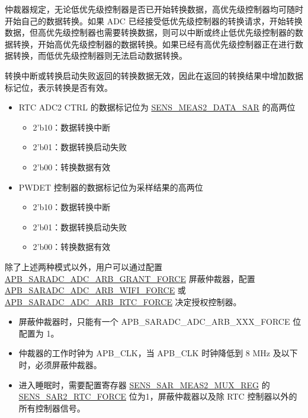 \documentclass[main\_\_CN.tex]{subfiles}
\begin{document}
仲裁器规定，无论低优先级控制器是否已开始转换数据，高优先级控制器均可随时开始自己的数据转换。如果 ADC 已经接受低优先级控制器的转换请求，开始转换数据，但高优先级控制器也需要转换数据，则可以中断或终止低优先级控制器的数据转换，开始高优先级控制器的数据转换。如果已经有高优先级控制器正在进行数据转换，而低优先级控制器则无法启动数据转换。

转换中断或转换启动失败返回的转换数据无效，因此在返回的转换结果中增加数据标记位，表示转换是否有效。

\begin{itemize}
    \item RTC ADC2 CTRL 的数据标记位为 \hyperref[fielddesc:SENSMEAS2DATASAR]{SENS\_MEAS2\_DATA\_SAR} 的高两位
    \begin{itemize}
        \item 2'b10：数据转换中断
        \item 2'b01：数据转换启动失败
        \item 2'b00：转换数据有效
    \end{itemize}
    \item PWDET 控制器的数据标记位为采样结果的高两位

    \begin{itemize}
        \item 2'b10：数据转换中断
        \item 2'b01：数据转换启动失败
        \item 2'b00：转换数据有效
    \end{itemize}
\end{itemize}
除了上述两种模式以外，用户可以通过配置 \hyperref[fielddesc:APBSARADCADCARBGRANTFORCE]{APB\_SARADC\_ADC\_ARB\_GRANT\_FORCE} 屏蔽仲裁器，配置\\ \hyperref[fielddesc:APBSARADCADCARBWIFIFORCE]{APB\_SARADC\_ADC\_ARB\_WIFI\_FORCE} 或 \hyperref[fielddesc:APBSARADCADCARBRTCFORCE]{APB\_SARADC\_ADC\_ARB\_RTC\_FORCE} 决定授权控制器。

\begin{tiplisting}
\vspace{-2em}
\begin{itemize}
    \item 屏蔽仲裁器时，只能有一个 APB\_SARADC\_ADC\_ARB\_XXX\_FORCE 位配置为 1。
    \item 仲裁器的工作时钟为 APB\_CLK，当 APB\_CLK 时钟降低到 8 MHz 及以下时，必须屏蔽仲裁器。
    \item 进入睡眠时，需要配置寄存器 \hyperref[regdesc:SENSSARMEAS2MUXREG]{SENS\_SAR\_MEAS2\_MUX\_REG} 的 \hyperref[fielddesc:SENSSAR2RTCFORCE]{SENS\_SAR2\_RTC\_FORCE} 位为1，屏蔽仲裁器以及除 RTC 控制器以外的所有控制器信号。
\end{itemize}
\end{tiplisting}
\end{document}
